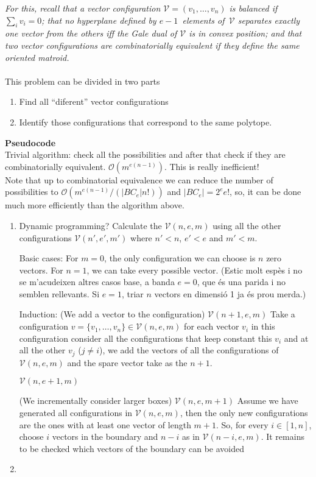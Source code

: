 \documentclass[11pt]{article}
\newcommand{\VV}{\mathcal{V}}
\begin{document}
\emph{For this, recall that a vector configuration $\VV = (v_1,\dots,v_n)$ is balanced if $\sum_i v_i=0$;
that no hyperplane defined by $e-1$~elements of~$\VV$ separates   exactly one vector from the others iff the Gale dual of $\VV$ is in   convex position; and that two vector configurations are combinatorially equivalent if they define the same oriented matroid.}
\\\\This problem can be divided in two parts
\begin{enumerate}
	\item Find all ``diferent'' vector configurations
	\item Identify those configurations that correspond to the same polytope.
\end{enumerate}
\textbf{Pseudocode}
\\Trivial algorithm: check all the possibilities and after that check if they are combinatorially equivalent. $\mathcal{O}(m^{e(n-1)})$. This is really inefficient!
\\Note that up to combinatorial equivalence we can reduce the number of possibilities to $\mathcal{O}(m^{e(n-1)}/(|BC_e|n!))$ and $|BC_e| = 2^e e!$, so, it can be done much more efficiently than the algorithm above.
\begin{enumerate}
\item Dynamic programming? Calculate the $\mathcal{V}(n,e,m)$ using all the other configurations $\mathcal{V}(n',e',m')$ where $n'<n$, $e'<e$ and $m'<m$. 

Basic cases:
For $m=0$, the only configuration we can choose is $n$ zero vectors.
For $n=1$, we can take every possible vector.
(Estic molt esp\`es i no se m'acudeixen altres casos base, a banda $e=0$, que \'es una parida i no semblen rellevants. Si $e=1$, triar $n$ vectors en dimensi\'o 1 ja \'es prou merda.)

Induction:
(We add a vector to the configuration) $\mathcal{V}(n + 1,e,m)$
Take a configuration $v = \{v_1, \ldots, v_n\}\in \mathcal{V}(n,e,m)$ for each vector $v_i$ in this configuration consider all the configurations that keep constant this $v_i$ and at all the other $v_j$ ($j \neq i$), we add the vectors of all the configurations of $\mathcal{V}(n,e,m)$ and the spare vector take as the $n+1$.

$\mathcal{V}(n,e + 1,m)$

(We incrementally consider larger boxes) $\mathcal{V}(n,e,m + 1)$
Assume we have generated all configurations in $\mathcal{V}(n,e,m)$, then the only new configurations are the ones with at least one vector of length $m+1$. So, for every $i \in [1,n]$, choose $i$ vectors in the boundary and $n-i$ as in $\mathcal{V}(n-i,e,m)$. It remains to be checked which vectors of the boundary can be avoided


\item
\end{enumerate}
\end{document}
